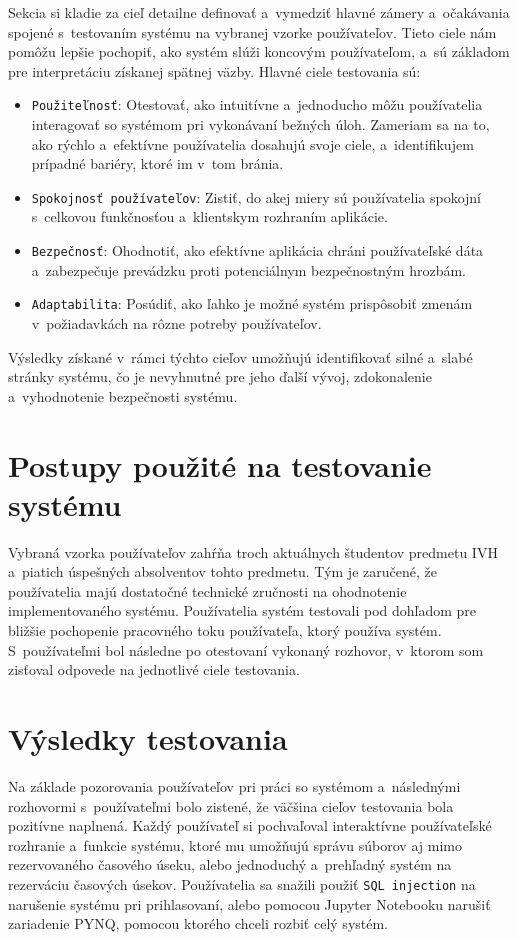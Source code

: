 Sekcia si kladie za cieľ detailne definovať a~vymedziť hlavné zámery a~očakávania spojené s~testovaním systému na vybranej vzorke používateľov. Tieto ciele nám pomôžu lepšie pochopiť, ako systém slúži koncovým používateľom, a~sú základom pre interpretáciu získanej spätnej väzby. Hlavné ciele testovania sú:
\begin{itemize}
    \item \verb|Použiteľnosť|: Otestovať, ako intuitívne a~jednoducho môžu používatelia interagovať so systémom pri vykonávaní bežných úloh. Zameriam sa na to, ako rýchlo a~efektívne používatelia dosahujú svoje ciele, a~identifikujem prípadné bariéry, ktoré im v~tom bránia. 
    \item \verb|Spokojnosť používateľov|: Zistiť, do akej miery sú používatelia spokojní s~celkovou funkčnosťou a~klientskym rozhraním aplikácie.
    \item \verb|Bezpečnosť|: Ohodnotiť, ako efektívne aplikácia chráni používateľské dáta a~zabezpečuje prevádzku proti potenciálnym bezpečnostným hrozbám. 
    \item \verb|Adaptabilita|: Posúdiť, ako ľahko je možné systém prispôsobiť zmenám v~požiadavkách na rôzne potreby používateľov.
\end{itemize}

Výsledky získané v~rámci týchto cieľov umožňujú identifikovať silné a~slabé stránky systému, čo je nevyhnutné pre jeho ďalší vývoj, zdokonalenie a~vyhodnotenie bezpečnosti systému.

\section{Postupy použité na testovanie systému}

Vybraná vzorka používateľov zahŕňa troch aktuálnych študentov predmetu IVH a~piatich úspešných absolventov tohto predmetu. Tým je zaručené, že používatelia majú dostatočné technické zručnosti na ohodnotenie implementovaného systému. Používatelia systém testovali pod dohľadom pre bližšie pochopenie pracovného toku používateľa, ktorý používa systém. S~používateľmi bol následne po otestovaní vykonaný rozhovor, v~ktorom som zisťoval odpovede na jednotlivé ciele testovania. 

\section{Výsledky testovania}

Na základe pozorovania používateľov pri práci so systémom a~následnými rozhovormi s~používateľmi bolo zistené, že väčšina cieľov testovania bola pozitívne naplnená. Každý používateľ si pochvaľoval interaktívne používateľské rozhranie a~funkcie systému, ktoré mu umožňujú správu súborov aj mimo rezervovaného časového úseku, alebo jednoduchý a~prehľadný systém na rezerváciu časových úsekov. Používatelia sa snažili použiť \verb|SQL injection| na narušenie systému pri prihlasovaní, alebo pomocou Jupyter Notebooku narušiť zariadenie PYNQ,  pomocou ktorého chceli rozbiť celý systém. 

